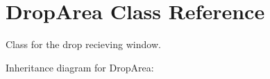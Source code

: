 \hypertarget{classDropArea}{}\section{Drop\+Area Class Reference}
\label{classDropArea}


Class for the drop recieving window.  




Inheritance diagram for Drop\+Area\+:
